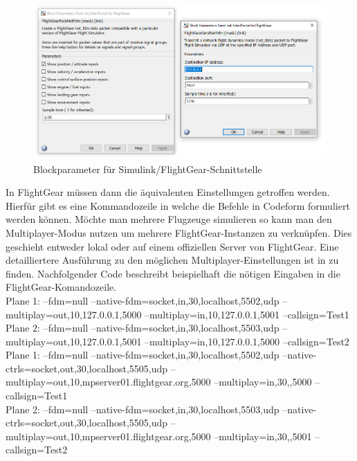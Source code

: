 \begin{figure}[h]
	\centering
	\includegraphics[width=\textwidth]{./Bilder/Visual_NetFdmBlockParam.png}
	\caption{Blockparameter für Simulink/FlightGear-Schnittstelle}
	\label{fig:VisualFGBlockParam}
\end{figure}

In FlightGear müssen dann die äquivalenten Einstellungen getroffen werden. Hierfür gibt es eine Kommandozeile in welche die Befehle in Codeform formuliert werden können. 
Möchte man mehrere Flugzeuge simulieren so kann man den Multiplayer-Modus nutzen um mehrere FlightGear-Instanzen zu verknüpfen. Dies geschieht entweder lokal oder auf einem offiziellen Server von FlightGear. Eine detailliertere Ausführung zu den möglichen Multiplayer-Einstellungen ist in \cite{How2Multi} zu finden.
Nachfolgender Code beschreibt beispielhaft die nötigen Eingaben in die FlightGear-Komandozeile.\\

Plane 1: --fdm=null --native-fdm=socket,in,30,localhost,5502,udp --multiplay=out,10,127.0.0.1,5000 --multiplay=in,10,127.0.0.1,5001 --callsign=Test1 \\

Plane 2: --fdm=null --native-fdm=socket,in,30,localhost,5503,udp --multiplay=out,10,127.0.0.1,5001 --multiplay=in,10,127.0.0.1,5000 --callsign=Test2\\


Plane 1: --fdm=null --native-fdm=socket,in,30,localhost,5502,udp --native-ctrls=socket,out,30,localhost,5505,udp --multiplay=out,10,mpserver01.flightgear.org,5000 --multiplay=in,30,,5000 --callsign=Test1 \\

Plane 2: --fdm=null --native-fdm=socket,in,30,localhost,5503,udp --native-ctrls=socket,out,30,localhost,5505,udp --multiplay=out,10,mpserver01.flightgear.org,5000 --multiplay=in,30,,5001 --callsign=Test2 \\

